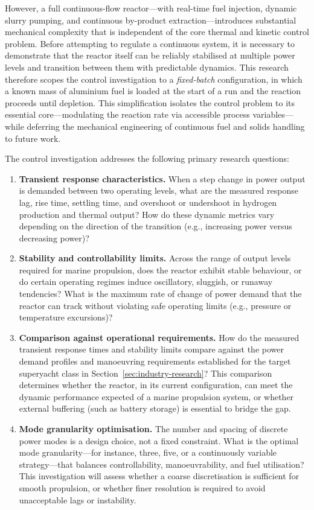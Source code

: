 \documentclass[12pt]{article}
\begin{document}
However, a full continuous-flow reactor---with real-time fuel injection, dynamic slurry pumping, and continuous by-product extraction---introduces substantial mechanical complexity that is independent of the core thermal and kinetic control problem. Before attempting to regulate a continuous system, it is necessary to demonstrate that the reactor itself can be reliably stabilised at multiple power levels and transition between them with predictable dynamics. This research therefore scopes the control investigation to a \emph{fixed-batch} configuration, in which a known mass of aluminium fuel is loaded at the start of a run and the reaction proceeds until depletion. This simplification isolates the control problem to its essential core---modulating the reaction rate via accessible process variables---while deferring the mechanical engineering of continuous fuel and solids handling to future work.

The control investigation addresses the following primary research questions:

\begin{enumerate}
    \item \textbf{Transient response characteristics.} When a step change in power output is demanded between two operating levels, what are the measured response lag, rise time, settling time, and overshoot or undershoot in hydrogen production and thermal output? How do these dynamic metrics vary depending on the direction of the transition (e.g., increasing power versus decreasing power)?

    \item \textbf{Stability and controllability limits.} Across the range of output levels required for marine propulsion, does the reactor exhibit stable behaviour, or do certain operating regimes induce oscillatory, sluggish, or runaway tendencies? What is the maximum rate of change of power demand that the reactor can track without violating safe operating limits (e.g., pressure or temperature excursions)?

    \item \textbf{Comparison against operational requirements.} How do the measured transient response times and stability limits compare against the power demand profiles and manoeuvring requirements established for the target superyacht class in Section~\ref{sec:industry-research}? This comparison determines whether the reactor, in its current configuration, can meet the dynamic performance expected of a marine propulsion system, or whether external buffering (such as battery storage) is essential to bridge the gap.

    \item \textbf{Mode granularity optimisation.} The number and spacing of discrete power modes is a design choice, not a fixed constraint. What is the optimal mode granularity---for instance, three, five, or a continuously variable strategy---that balances controllability, manoeuvrability, and fuel utilisation? This investigation will assess whether a coarse discretisation is sufficient for smooth propulsion, or whether finer resolution is required to avoid unacceptable lags or instability.
\end{enumerate}
\end{document}
